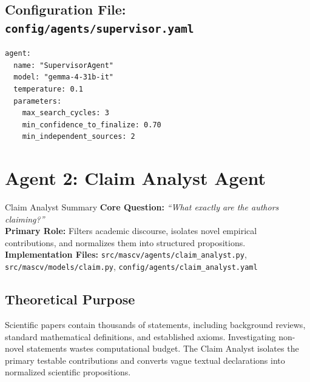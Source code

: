 \documentclass[11pt,a4paper]{article}
\begin{document}
\subsection{Configuration File: \texttt{config/agents/supervisor.yaml}}
\begin{lstlisting}
agent:
  name: "SupervisorAgent"
  model: "gemma-4-31b-it"
  temperature: 0.1
  parameters:
    max_search_cycles: 3
    min_confidence_to_finalize: 0.70
    min_independent_sources: 2
\end{lstlisting}

\section{Agent 2: Claim Analyst Agent}

\begin{agentbox}{Claim Analyst Summary}
\textbf{Core Question:} \textit{``What exactly are the authors claiming?''}\\
\textbf{Primary Role:} Filters academic discourse, isolates novel empirical contributions, and normalizes them into structured propositions.\\
\textbf{Implementation Files:} \texttt{src/mascv/agents/claim\_analyst.py}, \texttt{src/mascv/models/claim.py}, \texttt{config/agents/claim\_analyst.yaml}
\end{agentbox}

\subsection{Theoretical Purpose}
Scientific papers contain thousands of statements, including background reviews, standard mathematical definitions, and established axioms. Investigating non-novel statements wastes computational budget. The Claim Analyst isolates the primary testable contributions and converts vague textual declarations into normalized scientific propositions.
\end{document}

